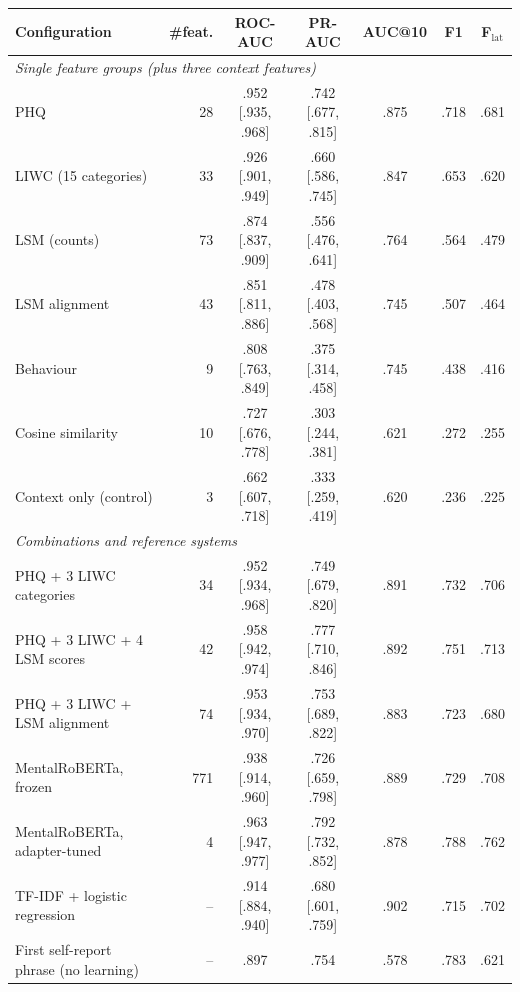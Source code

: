 \begin{tabular}{lrccccc}
\toprule
Configuration & \#feat. & ROC-AUC & PR-AUC & AUC@10 & F1 & F$_{\mathrm{lat}}$ \\
\midrule
\multicolumn{7}{l}{\textit{Single feature groups (plus three context features)}} \\
PHQ & 28 & .952 [.935, .968] & .742 [.677, .815] & .875 & .718 & .681 \\
LIWC (15 categories) & 33 & .926 [.901, .949] & .660 [.586, .745] & .847 & .653 & .620 \\
LSM (counts) & 73 & .874 [.837, .909] & .556 [.476, .641] & .764 & .564 & .479 \\
LSM alignment & 43 & .851 [.811, .886] & .478 [.403, .568] & .745 & .507 & .464 \\
Behaviour & 9 & .808 [.763, .849] & .375 [.314, .458] & .745 & .438 & .416 \\
Cosine similarity & 10 & .727 [.676, .778] & .303 [.244, .381] & .621 & .272 & .255 \\
Context only (control) & 3 & .662 [.607, .718] & .333 [.259, .419] & .620 & .236 & .225 \\
\midrule
\multicolumn{7}{l}{\textit{Combinations and reference systems}} \\
PHQ + 3 LIWC categories & 34 & .952 [.934, .968] & .749 [.679, .820] & .891 & .732 & .706 \\
PHQ + 3 LIWC + 4 LSM scores & 42 & .958 [.942, .974] & .777 [.710, .846] & .892 & .751 & .713 \\
PHQ + 3 LIWC + LSM alignment & 74 & .953 [.934, .970] & .753 [.689, .822] & .883 & .723 & .680 \\
MentalRoBERTa, frozen & 771 & .938 [.914, .960] & .726 [.659, .798] & .889 & .729 & .708 \\
MentalRoBERTa, adapter-tuned & 4 & .963 [.947, .977] & .792 [.732, .852] & .878 & .788 & .762 \\
TF-IDF + logistic regression & -- & .914 [.884, .940] & .680 [.601, .759] & .902 & .715 & .702 \\
First self-report phrase (no learning) & -- & .897 & .754 & .578 & .783 & .621 \\
\bottomrule
\end{tabular}
